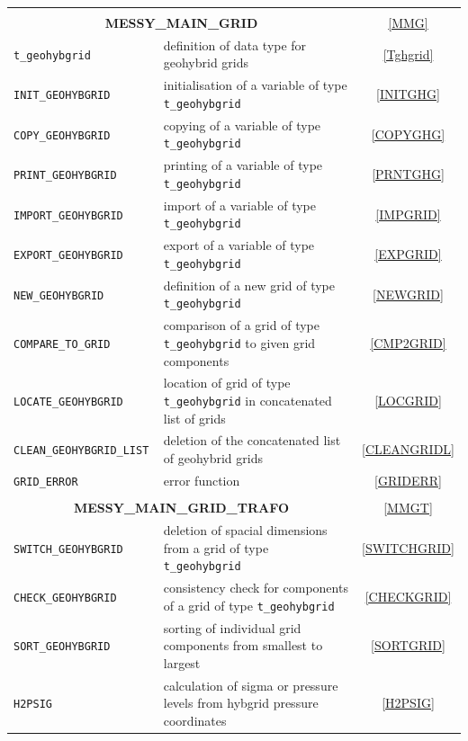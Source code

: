 \documentclass[11pt,twoside]{article}
\begin{document}
\begin{longtable}{|p{5cm}p{8.5cm}c|}
 & & \\ 
\multicolumn{2}{|c}{\bf \large MESSY\_MAIN\_GRID}& \ref{MMG}\\ \hline 
\color{red} \tt t\_geohybgrid & definition of data type for geohybrid
 grids& \ref{Tghgrid}\\
\color{blue} \tt {INIT\_GEOHYBGRID} & initialisation of a variable of
type \verb|t_geohybgrid| & \ref{INITGHG}\\
\color{blue} \tt {COPY\_GEOHYBGRID} & copying of a variable of
type \verb|t_geohybgrid| & \ref{COPYGHG}\\
\color{blue} \tt {PRINT\_GEOHYBGRID} & printing of a variable of
type \verb|t_geohybgrid| & \ref{PRNTGHG}\\
\color{blue} \tt {IMPORT\_GEOHYBGRID} & import of a  variable of
type \verb|t_geohybgrid| & \ref{IMPGRID}\\
\color{blue} \tt {EXPORT\_GEOHYBGRID} & export of a variable of
type \verb|t_geohybgrid| & \ref{EXPGRID}\\
\color{blue} \tt {NEW\_GEOHYBGRID} & definition of a new grid of
type \verb|t_geohybgrid| & \ref{NEWGRID}\\
\color{blue} \tt {COMPARE\_TO\_GRID} & comparison of a grid of
type \verb|t_geohybgrid| to given grid components& \ref{CMP2GRID}\\
\color{blue} \tt {LOCATE\_GEOHYBGRID} & location of grid of
type \verb|t_geohybgrid| in concatenated list of grids & \ref{LOCGRID}\\
\color{blue} \tt {CLEAN\_GEOHYBGRID\_LIST} & deletion of the concatenated list
of geohybrid grids & \ref{CLEANGRIDL}\\
\color{blue} \tt {GRID\_ERROR} & error function & \ref{GRIDERR}\\
 & & \\ 
\multicolumn{2}{|c}{\bf \large MESSY\_MAIN\_GRID\_TRAFO}& \ref{MMGT}\\ \hline 
\color{blue} \tt {SWITCH\_GEOHYBGRID} & deletion of spacial dimensions
from a grid of type \verb|t_geohybgrid| & \ref{SWITCHGRID}\\
\color{blue} \tt {CHECK\_GEOHYBGRID} & consistency check for
components of a grid of type \verb|t_geohybgrid| & \ref{CHECKGRID}\\
\color{blue} \tt {SORT\_GEOHYBGRID} & sorting of individual grid
components from smallest to largest & \ref{SORTGRID}\\
\color{blue} \tt {H2PSIG} & calculation of sigma or pressure levels
from hybgrid pressure coordinates & \ref{H2PSIG}\\

\end{longtable}
\end{document}
